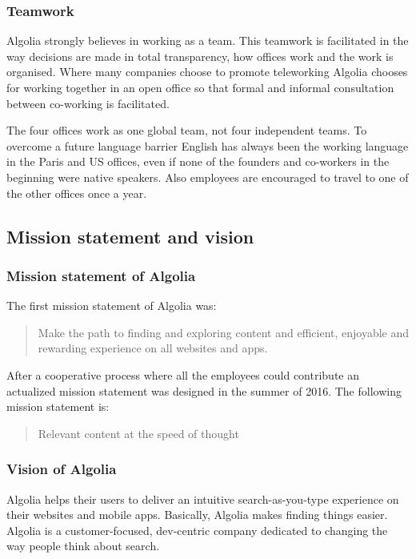 
\subsubsection{Teamwork}

Algolia strongly believes in working as a team. This teamwork is facilitated in the way decisions are made in total transparency, how offices work and the work is organised. Where many companies choose to promote teleworking Algolia chooses for working together in an open office so that formal and informal consultation between co-working is facilitated.

The four offices work as one global team, not four independent teams. To overcome a future language barrier English has always been the working language in the Paris and US offices, even if none of the founders and co-workers in the beginning were native speakers. Also employees are encouraged to travel to one of the other offices once a year. 

\subsection{Mission statement and vision}
\subsubsection{Mission statement of Algolia}

The first mission statement of Algolia was:


\begin{quote}
Make the path to finding and exploring content and efficient, enjoyable and rewarding experience on all websites and apps.
\end{quote}

After a cooperative process where all the employees could contribute an actualized mission statement was designed in the summer of 2016. The following mission statement is:

\begin{quote}
Relevant content at the speed of thought
\end{quote}

\subsubsection{Vision of Algolia}

Algolia helps their users to deliver an intuitive search-as-you-type experience on their websites and mobile apps. Basically, Algolia makes finding things easier. Algolia is a customer-focused, dev-centric company dedicated to changing the way people think about search.

